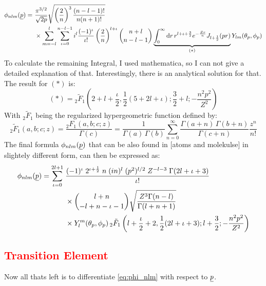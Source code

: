 \begin{align*}
    \phi_{nlm}(\underline{p}) =\ & \frac{\pi^{3/2}}{\sqrt{2p}}\sqrt{\left(\frac{2}{n}\right)^3\frac{(n-l-1)!}{n(n+1)!}}\\
    & \times \sum_{m=-l}^{l}\sum_{\iota=0}^{n-l-1}i^l\frac{(-1)^{\iota}}{\iota!}\left(\frac{2}{n}\right)^{l+\iota}\binom{n+l}{n-l-1}\underbrace{\int_{0}^{\infty}\mathrm{d} r\,r^{l+\iota+\frac{3}{2}}e^{-\frac{Zr}{n}}J_{l+\frac{1}{2}}(pr)}_{(*)} Y_{lm}(\theta_p,\phi_p)
\end{align*}
To calculate the remaining Integral, I used mathematica, so I can not give a detailed explanation of that. Interestingly, there is an analytical solution for that. 
The result for $(*)$ is:
\begin{equation*}
    (*) = {}_2\tilde{F}_1\left(2 + l + \frac{\iota}{2}, \frac{1}{2}(5 + 2l + \iota); \frac{3}{2} + l; -\frac{n^2 p^2}{Z^2}\right)
\end{equation*}
With ${}_2\tilde{F}_1$ being the regularized hypergeometric function defined by:
\begin{equation*}
    {}_2\tilde{F}_1(a,b;c;z) = \frac{{}_2F_1(a,b;c;z)}{\Gamma(c)} = \frac{1}{\Gamma(a)\,\Gamma(b)} \sum_{n=0}^{\infty} \frac{\Gamma(a+n)\,\Gamma(b+n)}{\Gamma(c+n)} \frac{z^n}{n!}
\end{equation*}
The final formula $\phi_{nlm}(\underline{p})$ that can be also found in [atoms and molekulse] in slightely different form, can then be expressed as:
\begin{align}
    \label{eq:phi_nlm}
    \phi_{nlm}(\underline{p}) = \sum_{\iota=0}^{2l+1} \;
        & \frac{(-1)^{\iota} \; 2^{\iota + \frac{1}{2}} \; n \; (i n)^l \; (p^2)^{l/2} \; Z^{-l-3} \; \Gamma(2l+\iota+3)}{\iota!} \nonumber \\
        & \times \binom{l+n}{-l+n-\iota-1} 
        \sqrt{\frac{Z^3 \Gamma(n-l)}{\Gamma(l+n+1)}} \nonumber \\
        & \times Y_l^m(\theta_p, \phi_p) \,
        {}_2\tilde{F}_1\left(l+\frac{\iota}{2}+2, \frac{1}{2}(2l+\iota+3); l+\frac{3}{2}; -\frac{n^2 p^2}{Z^2}\right)
\end{align}








\subsection*{\textcolor{red}{Transition Element}}
Now all thats left is to differentiate \eqref{eq:phi_nlm} with respect to $\underline{p}$. 


